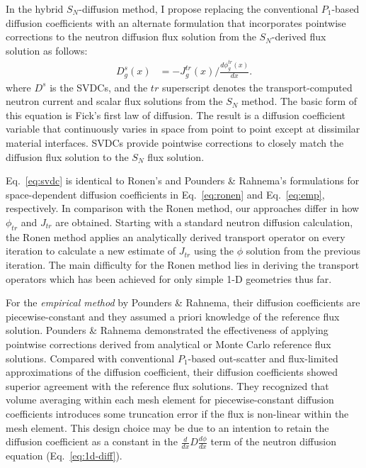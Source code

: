 In the hybrid $S_N$-diffusion method, I propose replacing the conventional $P_1$-based
diffusion coefficients with an alternate formulation that incorporates pointwise corrections
to the neutron diffusion flux solution from the $S_N$-derived flux solution as follows:
%
\begin{align}
  D^s_g(x) &= -J^{tr}_g(x)\bigg/\frac{d\phi^{tr}_g(x)}{dx}. \label{eq:svdc}
\end{align}
%
where $D^s$ is the \glspl{SVDC}, and the $tr$ superscript denotes the transport-computed neutron
current and scalar flux solutions from the $S_N$ method.
The basic form of this equation is Fick's first law of diffusion. The result is a diffusion
coefficient variable that continuously varies in space from point to point except at dissimilar
material interfaces. \glspl{SVDC} provide pointwise corrections to closely match the diffusion flux
solution to the $S_N$ flux solution.

Eq.\ \ref{eq:svdc} is identical to Ronen's \cite{ronen_accurate_2004} and Pounders \& Rahnema's
\cite{pounders_diffusion_2009} formulations for space-dependent diffusion coefficients in Eq.\
\ref{eq:ronen} and Eq.\ \ref{eq:emp}, respectively. In comparison with
the Ronen method, our approaches differ in how $\phi_{tr}$ and $J_{tr}$ are obtained. Starting with
a standard neutron diffusion calculation, the Ronen method applies an analytically derived
transport operator on every iteration to calculate a new estimate of $J_{tr}$ using the $\phi$
solution from the previous iteration. The main difficulty for the Ronen method lies in deriving the
transport operators which has been achieved for only simple 1-D geometries thus far.

For the \textit{empirical method} by Pounders \& Rahnema, their diffusion coefficients are
piecewise-constant and they assumed a priori knowledge of the reference flux solution.
Pounders \& Rahnema \cite{pounders_diffusion_2009} demonstrated the effectiveness of applying
pointwise corrections derived from analytical or Monte Carlo reference flux solutions. Compared
with conventional $P_1$-based out-scatter and flux-limited approximations of the diffusion
coefficient, their diffusion coefficients showed superior agreement
with the reference flux solutions. They recognized that volume averaging within each mesh element
for piecewise-constant diffusion coefficients introduces some truncation error if the flux is
non-linear within the mesh element. This design choice may be due to an intention to retain the
diffusion coefficient as a constant in the $\frac{d}{dx}D\frac{d\phi}{dx}$ term of the neutron
diffusion equation (Eq.\ \ref{eq:1d-diff}).

